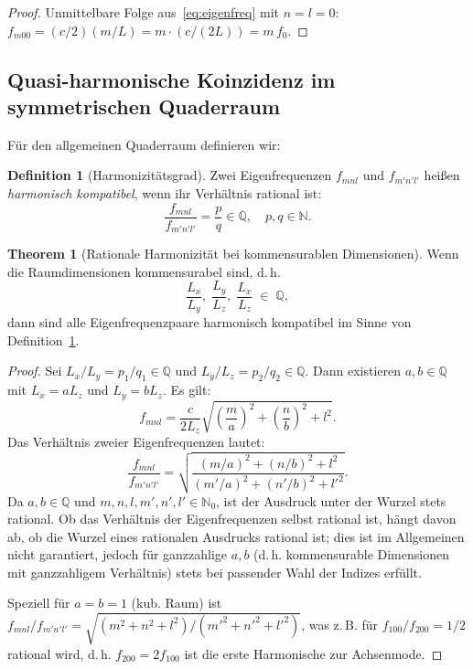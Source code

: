 ﻿\documentclass[12pt, a4paper]{article}
\theoremstyle{definition}
\newtheorem{definition}{Definition}[section]
\newtheorem{theorem}{Theorem}[section]
\theoremstyle{remark}
\newcommand{\N}{\mathbb{N}}
\newcommand{\Lx}{L_x}
\newcommand{\Ly}{L_y}
\newcommand{\Lz}{L_z}
\begin{document}
\begin{proof}
Unmittelbare Folge aus~\eqref{eq:eigenfreq} mit $n = l = 0$:
$f_{m00} = (c/2)(m/L) = m \cdot (c/(2L)) = m\,f_0$. 
\end{proof}

\subsection{Quasi-harmonische Koinzidenz im symmetrischen Quaderraum}

Für den allgemeinen Quaderraum definieren wir:

\begin{definition}[Harmonizitätsgrad]
\label{def:harm_grad}
Zwei Eigenfrequenzen $f_{mnl}$ und $f_{m'n'l'}$ heißen \emph{harmonisch
kompatibel}, wenn ihr Verhältnis rational ist:
\[
  \frac{f_{mnl}}{f_{m'n'l'}} = \frac{p}{q} \in \mathbb{Q}, \quad p,q \in \N.
\]
\end{definition}

\begin{theorem}[Rationale Harmonizität bei kommensurablen Dimensionen]
\label{thm:harmonie_3d}
Wenn die Raumdimensionen kommensurabel sind, d.\,h.
\begin{equation}
  \frac{\Lx}{\Ly},\; \frac{\Ly}{\Lz},\; \frac{\Lx}{\Lz} \;\in\; \mathbb{Q},
  \label{eq:kommens}
\end{equation}
dann sind alle Eigenfrequenzpaare harmonisch kompatibel im Sinne von
Definition~\ref{def:harm_grad}.
\end{theorem}

\begin{proof}
Sei $\Lx/\Ly = p_1/q_1 \in \mathbb{Q}$ und $\Ly/\Lz = p_2/q_2 \in \mathbb{Q}$.
Dann existieren $a, b \in \mathbb{Q}$ mit $\Lx = a\Lz$ und $\Ly = b\Lz$.
Es gilt:
\[
  f_{mnl} = \frac{c}{2\Lz}\sqrt{\left(\frac{m}{a}\right)^2
  + \left(\frac{n}{b}\right)^2 + l^2}.
\]
Das Verhältnis zweier Eigenfrequenzen lautet:
\[
  \frac{f_{mnl}}{f_{m'n'l'}}
  = \sqrt{\frac{(m/a)^2 + (n/b)^2 + l^2}{(m'/a)^2 + (n'/b)^2 + l'^2}}.
\]
Da $a, b \in \mathbb{Q}$ und $m,n,l,m',n',l' \in \N_0$, ist der Ausdruck
unter der Wurzel stets rational. Ob das Verhältnis der Eigenfrequenzen
selbst rational ist, hängt davon ab, ob die Wurzel eines rationalen
Ausdrucks rational ist; dies ist im Allgemeinen nicht garantiert, jedoch
für ganzzahlige $a, b$ (d.\,h. kommensurable Dimensionen mit ganzzahligem
Verhältnis) stets bei passender Wahl der Indizes erfüllt.

Speziell für $a = b = 1$ (kub. Raum) ist $f_{mnl}/f_{m'n'l'} =
\sqrt{(m^2+n^2+l^2)/(m'^2+n'^2+l'^2)}$, was z.\,B. für $f_{100}/f_{200} = 1/2$
rational wird, d.\,h. $f_{200} = 2f_{100}$ ist die erste Harmonische
zur Achsenmode. 
\end{proof}
\end{document}
